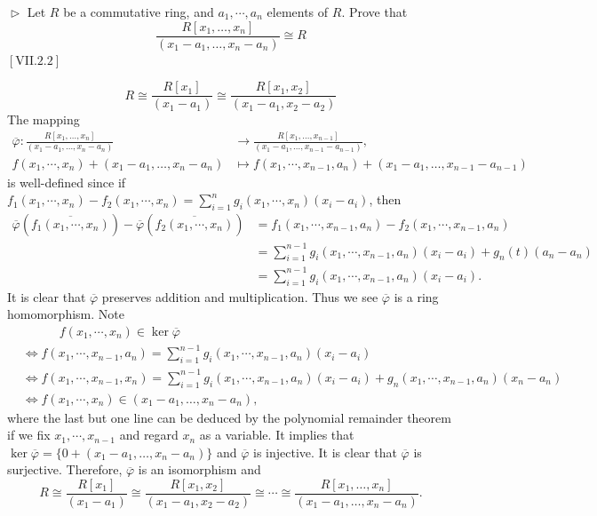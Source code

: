\documentclass[12pt,letterpaper,boxed]{hmcpset}
\begin{document}
\begin{problem}[4.12]
	$\vartriangleright$ Let $R$ be a commutative ring, and $a_{1}, \cdots, a_{n}$ elements of $R .$ Prove that
	\[
	\frac{R\left[x_{1}, \ldots, x_{n}\right]}{\left(x_{1}-a_{1}, \ldots, x_{n}-a_{n}\right)} \cong R
	\]
	$[\mathrm{VII} .2 .2]$	
\end{problem}
\begin{solution}
	\[
	R\cong \frac{R\left[x_{1}\right]}{\left(x_{1}-a_{1}\right)}\cong \frac{R\left[x_{1},x_{2}\right]}{\left(x_{1}-a_{1},x_2-a_2\right)}
	\]
	The mapping
	\begin{align*}
	\overline{\varphi}:\frac{R\left[x_{1}, \ldots, x_{n}\right]}{\left(x_{1}-a_{1}, \ldots, x_{n}-a_{n}\right)}& \longrightarrow \frac{R\left[x_{1}, \ldots, x_{n-1}\right]}{\left(x_{1}-a_{1}, \ldots, x_{n-1}-a_{n-1}\right)},\\
	f(x_1,\cdots,x_n)+\left(x_{1}-a_{1}, \ldots, x_{n}-a_{n}\right)& \longmapsto f(x_1,\cdots,x_{n-1},a_n)+\left(x_{1}-a_{1}, \ldots, x_{n-1}-a_{n-1}\right)
	\end{align*}
	is well-defined since if $f_1\left(x_1,\cdots,x_n\right)-f_2\left(x_1,\cdots,x_n\right)=\sum\limits_{i=1}^n g_i(x_1,\cdots,x_n)(x_i-a_i)$, then
	\begin{align*}
	\overline{\varphi}\left(\overline{f_1(x_1,\cdots,x_n)}\right)-\overline{\varphi}\left(\overline{f_2(x_1,\cdots,x_n)}\right)&=f_1(x_1,\cdots,x_{n-1},a_n)-f_2(x_1,\cdots,x_{n-1},a_n)\\
	&=\sum_{i=1}^{n-1} g_i(x_1,\cdots,x_{n-1},a_n)(x_i-a_i)+g_n(t)(a_n-a_n)\\
	&=\sum_{i=1}^{n-1} g_i(x_1,\cdots,x_{n-1},a_n)(x_i-a_i).
	\end{align*}
	It is clear that $\overline{\varphi}$ preserves addition and multiplication. Thus we see $\overline{\varphi}$ is a ring homomorphism. Note
	\begin{align*}
	&\hspace{3em}f(x_1,\cdots,x_n)\in\ker \overline{\varphi}\\
	&\iff f(x_1,\cdots,x_{n-1},a_n)=\sum_{i=1}^{n-1} g_i(x_1,\cdots,x_{n-1},a_n)(x_i-a_i)\\
	&\iff f(x_1,\cdots,x_{n-1},x_n)=\sum_{i=1}^{n-1} g_i(x_1,\cdots,x_{n-1},a_n)(x_i-a_i)+g_n(x_1,\cdots,x_{n-1},a_n)(x_n-a_n)\\
	&\iff f(x_1,\cdots,x_n)\in\left(x_{1}-a_{1}, \ldots, x_{n}-a_{n}\right),
	\end{align*}
	where the last but one line can be deduced by the polynomial remainder theorem if we fix $x_1,\cdots,x_{n-1}$ and regard $x_n$ as a variable. It implies that $\ker \overline{\varphi}=\{0+\left(x_{1}-a_{1}, \ldots, x_{n}-a_{n}\right)\}$ and $\overline{\varphi}$ is injective. It is clear that $\overline{\varphi}$ is surjective. Therefore, $\overline{\varphi}$ is an isomorphism and 
	\[
	R\cong \frac{R\left[x_{1}\right]}{\left(x_{1}-a_{1}\right)}\cong \frac{R\left[x_{1},x_{2}\right]}{\left(x_{1}-a_{1},x_2-a_2\right)}\cong\cdots \cong \frac{R\left[x_{1}, \ldots, x_{n}\right]}{\left(x_{1}-a_{1}, \ldots, x_{n}-a_{n}\right)}.
	\]
\end{solution}
\end{document}
